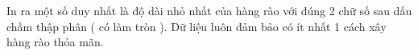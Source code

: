 In ra một số duy nhất là độ dài nhỏ nhất của hàng rào với đúng 2 chữ số sau dấu chấm thập phân ( có làm tròn ). Dữ liệu luôn đảm bảo có ít nhất 1 cách xây hàng rào thỏa mãn.  

\
